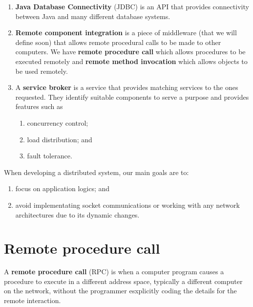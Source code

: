 \begin{example}
    \hfill
    \begin{enumerate}
        \item 
            \textbf{Java Database Connectivity} (JDBC) is an API that provides connectivity
            between Java and many different database systems.

        \item 
            \textbf{Remote component integration} is a piece of middleware 
            (that we will define soon) 
            that allows remote procedural calls to be made to other computers.
            We have \textbf{remote procedure call} which allows procedures to
            be executed remotely and \textbf{remote method invocation} which
            allows objects to be used remotely.

        \item A \textbf{service broker} is a service that provides matching
            services to the ones requested. 
            They identify suitable components to serve a purpose and provides
            features such as
            \begin{enumerate}
                \item concurrency control;
                \item load distribution; and
                \item fault tolerance.
            \end{enumerate}
    \end{enumerate}
\end{example}

\begin{remark}
    When developing a distributed system, our main goals are to:
    \begin{enumerate}
        \item focus on application logics; and
        \item avoid implementating socket communications or working with any
            network architectures due to its dynamic changes.
    \end{enumerate}
\end{remark}

\section{Remote procedure call}

\begin{definition}
    A \textbf{remote procedure call} (RPC) is when a computer program causes
    a procedure to execute in a different address space,
    typically a different computer on the network,
    without the programmer esxplicitly coding the details for the remote
    interaction.
\end{definition}

